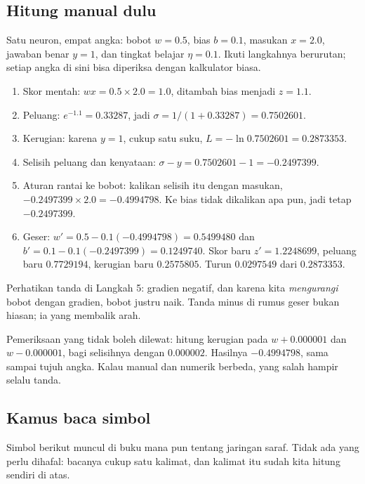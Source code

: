 \subsection{Hitung manual dulu}

\begin{contoh}
Satu neuron, empat angka: bobot $w = 0.5$, bias $b = 0.1$, masukan $x = 2.0$, jawaban benar
$y = 1$, dan tingkat belajar $\eta = 0.1$. Ikuti langkahnya berurutan; setiap angka di sini
bisa diperiksa dengan kalkulator biasa.

\begin{enumerate}
  \item Skor mentah: $w x = 0.5 \times 2.0 = 1.0$, ditambah bias menjadi $z = 1.1$.
  \item Peluang: $e^{-1.1} = 0.33287$, jadi $\sigma = 1/(1+0.33287) = 0.7502601$.
  \item Kerugian: karena $y = 1$, cukup satu suku, $L = -\ln 0.7502601 = 0.2873353$.
  \item Selisih peluang dan kenyataan: $\sigma - y = 0.7502601 - 1 = -0.2497399$.
  \item Aturan rantai ke bobot: kalikan selisih itu dengan masukan, $-0.2497399 \times 2.0
        = -0.4994798$. Ke bias tidak dikalikan apa pun, jadi tetap $-0.2497399$.
  \item Geser: $w' = 0.5 - 0.1(-0.4994798) = 0.5499480$ dan $b' = 0.1 - 0.1(-0.2497399)
        = 0.1249740$. Skor baru $z' = 1.2248699$, peluang baru $0.7729194$, kerugian baru
        $0.2575805$. Turun $0.0297549$ dari $0.2873353$.
\end{enumerate}

Perhatikan tanda di Langkah 5: gradien negatif, dan karena kita \emph{mengurangi} bobot
dengan gradien, bobot justru naik. Tanda minus di rumus geser bukan hiasan; ia yang
membalik arah.
\end{contoh}

Pemeriksaan yang tidak boleh dilewat: hitung kerugian pada $w + 0.000001$ dan
$w - 0.000001$, bagi selisihnya dengan $0.000002$. Hasilnya $-0.4994798$, sama sampai tujuh
angka. Kalau manual dan numerik berbeda, yang salah hampir selalu tanda.

\subsection{Kamus baca simbol}

Simbol berikut muncul di buku mana pun tentang jaringan saraf. Tidak ada yang perlu
dihafal: bacanya cukup satu kalimat, dan kalimat itu sudah kita hitung sendiri di atas.

